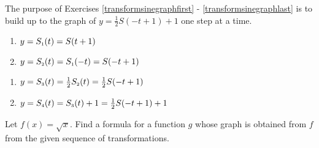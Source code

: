 The purpose of Exercises \ref{transformsinegraphfirst} - \ref{transformsinegraphlast} is to build up to the graph  of $y = \frac{1}{2}S(-t+1) + 1$  one step at a time.

\begin{multicols}{2}
\begin{enumerate}
\setcounter{enumi}{\value{HW}}

\item $y = S_{\text{\tiny $1$}}(t) = S(t + 1)$ \label{transformsinegraphfirst}
\item  $y = S_{\text{\tiny $2$}}(t) =  S_{\text{\tiny $1$}}(-t) = S(-t + 1)$

\setcounter{HW}{\value{enumi}}
\end{enumerate}
\end{multicols}

\begin{multicols}{2}
\begin{enumerate}
\setcounter{enumi}{\value{HW}}

\item  $y = S_{\text{\tiny $3$}}(t) = \frac{1}{2}  S_{\text{\tiny $2$}}(t) =  \frac{1}{2}S(-t+1)$
\item  $y = S_{\text{\tiny $4$}}(t) = S_{\text{\tiny $3$}}(t) + 1 = \frac{1}{2}S(-t+1) + 1$ \label{transformsinegraphlast}

\setcounter{HW}{\value{enumi}}
\end{enumerate}
\end{multicols}

Let $f(x) = \sqrt{x}$.  Find a formula for a function $g$ whose graph is obtained from $f$ from the given sequence of transformations. 

